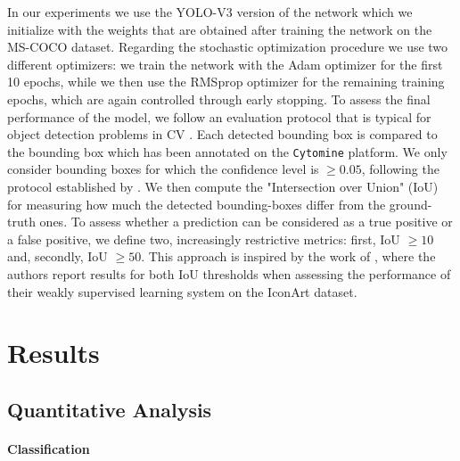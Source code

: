 In our experiments we use the YOLO-V3 version of the network which we initialize with the weights that are obtained after training the network on the MS-COCO dataset. Regarding the stochastic optimization procedure we use two different optimizers: we train the network with the Adam optimizer for the first 10 epochs, while we then use the RMSprop optimizer for the remaining training epochs, which are again controlled through early stopping. To assess the final performance of the model, we follow an evaluation protocol that is typical for object detection problems in CV \cite{lin2014microsoft}. Each detected bounding box is compared to the bounding box which has been annotated on the \texttt{Cytomine} platform. We only consider bounding boxes for which the confidence level is $\geq 0.05$, following the protocol established by \citet{everingham2010pascal}. We then compute the "Intersection over Union" (IoU) for measuring how much the detected bounding-boxes differ from the ground-truth ones. To assess whether a prediction can be considered as a true positive or a false positive, we define two, increasingly restrictive metrics: first, IoU $\geq10$ and, secondly, IoU $\geq50$. This approach is inspired by the work of \citet{gonthier2018weakly}, where the authors report results for both IoU thresholds when assessing the performance of their weakly supervised learning system on the IconArt dataset.

\section{Results}
\label{sec:results}

\subsection{Quantitative Analysis}
\paragraph{Classification}

